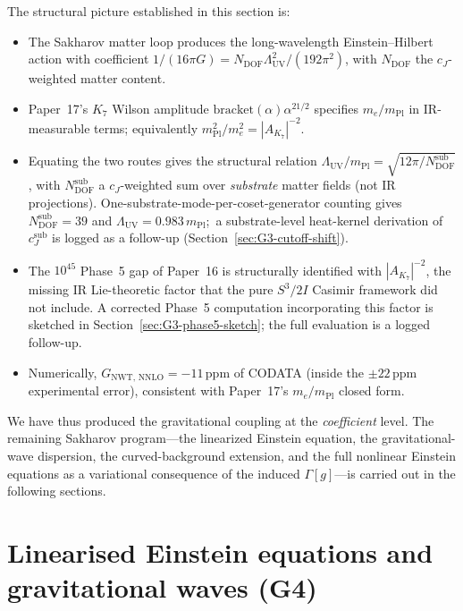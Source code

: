 \documentclass[11pt]{article}
\newcommand{\mPl}{m_{\mathrm{Pl}}}
\newcommand{\me}{m_e}
\begin{document}
The structural picture established in this section is:
\begin{itemize}
\item The Sakharov matter loop produces the long-wavelength
      Einstein--Hilbert action with coefficient
      $1/(16\pi G) = N_{\mathrm{DOF}}\Lambda_{\mathrm{UV}}^2 / (192\pi^2)$,
      with $N_{\mathrm{DOF}}$ the $c_J$-weighted matter content.
\item Paper~17's $K_7$ Wilson amplitude
      $\mathrm{bracket}(\alpha)\alpha^{21/2}$ specifies $\me/\mPl$ in
      IR-measurable terms; equivalently
      $\mPl^2/\me^2 = |A_{K_7}|^{-2}$.
\item Equating the two routes gives the structural relation
      $\Lambda_{\mathrm{UV}}/\mPl =
      \sqrt{12\pi/N_{\mathrm{DOF}}^{\mathrm{sub}}}$, with
      $N_{\mathrm{DOF}}^{\mathrm{sub}}$ a $c_J$-weighted sum over
      \emph{substrate} matter fields (not IR projections).
      One-substrate-mode-per-coset-generator counting gives
      $N_{\mathrm{DOF}}^{\mathrm{sub}} = 39$ and
      $\Lambda_{\mathrm{UV}} = 0.983\,\mPl$;\ a substrate-level
      heat-kernel derivation of $c_J^{\mathrm{sub}}$ is logged as a
      follow-up (Section~\ref{sec:G3-cutoff-shift}).
\item The $10^{45}$ Phase~5 gap of Paper~16 is structurally
      identified with $|A_{K_7}|^{-2}$, the missing IR
      Lie-theoretic factor that the pure $S^3/2I$ Casimir framework
      did not include.  A corrected Phase~5 computation
      incorporating this factor is sketched in
      Section~\ref{sec:G3-phase5-sketch}; the full evaluation is a
      logged follow-up.
\item Numerically, $G_{\mathrm{NWT,\,NNLO}} = -11$\,ppm of CODATA
      (inside the $\pm 22$\,ppm experimental error), consistent
      with Paper~17's $\me/\mPl$ closed form.
\end{itemize}

We have thus produced the gravitational coupling at the
\emph{coefficient} level.  The remaining Sakharov program---the
linearized Einstein equation, the gravitational-wave dispersion,
the curved-background extension, and the full nonlinear Einstein
equations as a variational consequence of the induced
$\Gamma[g]$---is carried out in the following sections.

\section{Linearised Einstein equations and gravitational waves (G4)}
\label{sec:G4-linearized}
\end{document}
